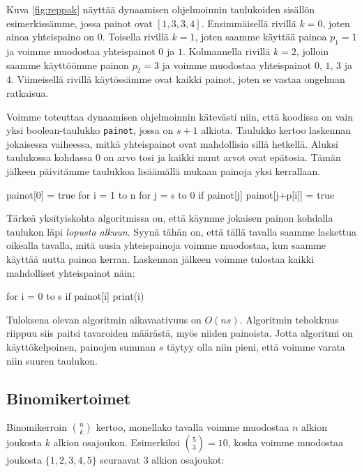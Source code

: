 Kuva \ref{fig:reppak} näyttää dynaamisen ohjelmoinnin
taulukoiden sisällön esimerkissämme, jossa painot ovat $[1,3,3,4]$.
Ensimmäisellä rivillä $k=0$, joten ainoa yhteispaino on $0$.
Toisella rivillä $k=1$, joten saamme käyttää painoa $p_1=1$
ja voimme muodostaa yhteispainot $0$ ja $1$.
Kolmannella rivillä $k=2$, jolloin saamme käyttöömme painon $p_2=3$
ja voimme muodostaa yhteispainot $0$, $1$, $3$ ja $4$.
Viimeisellä rivillä käytössämme ovat kaikki painot,
joten se vastaa ongelman ratkaisua.

Voimme toteuttaa dynaamisen ohjelmoinnin kätevästi niin,
että koodissa on vain yksi boolean-taulukko \texttt{painot},
jossa on $s+1$ alkiota.
Taulukko kertoo laskennan jokaisessa vaiheessa,
mitkä yhteispainot ovat mahdollisia sillä hetkellä.
Aluksi taulukossa kohdassa $0$ on arvo tosi ja
kaikki muut arvot ovat epätosia.
Tämän jälkeen päivitämme taulukkoa lisäämällä mukaan
painoja yksi kerrallaan.

\begin{code}
painot[0] = true
for i = 1 to n
    for j = s to 0
        if painot[j]
            painot[j+p[i]] = true
\end{code}

Tärkeä yksityiskohta algoritmissa on,
että käymme jokaisen painon kohdalla taulukon
läpi \emph{lopusta alkuun}.
Syynä tähän on, että tällä tavalla saamme
laskettua oikealla tavalla, mitä uusia yhteispainoja
voimme muodostaa, kun saamme käyttää uutta painoa kerran.
Laskennan jälkeen voimme tulostaa kaikki
mahdolliset yhteispainot näin:

\begin{code}
for i = 0 to s
    if painot[i]
        print(i)
\end{code}

Tuloksena olevan algoritmin aikavaativuus on $O(ns)$.
Algoritmin tehokkuus riippuu siis paitsi tavaroiden määrästä,
myös niiden painoista.
Jotta algoritmi on käyttökelpoinen, painojen summan $s$
täytyy olla niin pieni, että voimme varata niin suuren taulukon.

\subsection{Binomikertoimet}

Binomikerroin $\binom{n}{k}$ kertoo, monellako tavalla voimme
muodostaa $n$ alkion joukosta $k$ alkion osajoukon.
Esimerkiksi $\binom{5}{3}=10$, koska voimme muodostaa
joukosta $\{1,2,3,4,5\}$ seuraavat 3 alkion osajoukot:

